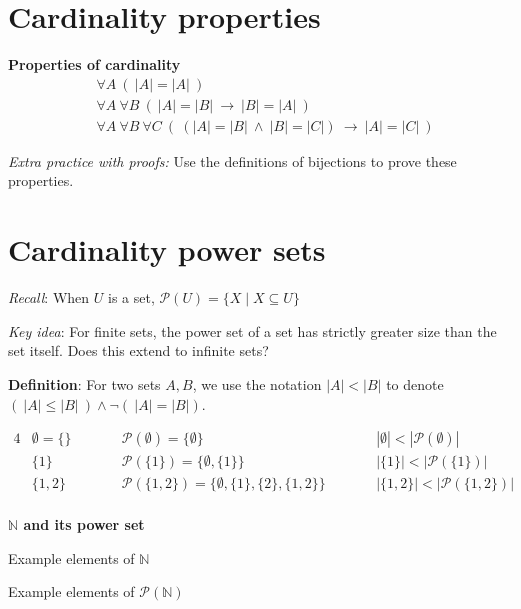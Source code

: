 \documentclass[12pt, oneside]{article}
\begin{document}
\begin{flushright}
\end{flushright} \section*{Cardinality properties}


{\bf Properties of cardinality}
\begin{align*}
&\forall A ~ (~  |A| = |A| ~)\\
&\forall A ~ \forall B ~(~ |A| = |B|  ~\to ~ |B| = |A|~)\\
&\forall A ~ \forall B ~ \forall C~ (~ (|A| = |B| ~\wedge~ |B| = |C|) ~\to ~ |A| = |C|~)
\end{align*}

{\it Extra practice with proofs:} Use the definitions of bijections to prove these properties. \vfill
\section*{Cardinality power sets}


{\it Recall}: When $U$ is a set, $\mathcal{P}(U) = \{ X \mid X \subseteq U\}$

{\it Key idea}: For finite sets, the power set of a set has strictly greater size than the set itself.
Does this extend to infinite sets?

{\bf Definition}: For two sets $A, B$, we use the notation $|A| < |B|$ to denote
$(~|A| \leq |B| ~) \land \lnot (~|A| = |B|)$.

\begin{alignat*}{4}
    &\emptyset = \{ \} \qquad &&\mathcal{P}(\emptyset) = \{ \emptyset \} \qquad &&|\emptyset| < |\mathcal{P}(\emptyset)| \\
    &\{1 \} \qquad &&\mathcal{P}(\{1\}) = \{ \emptyset, \{1\} \} \qquad &&|\{1\}| < |\mathcal{P}(\{1\})| \\
    &\{1,2 \} \qquad &&\mathcal{P}(\{1,2\}) = \{ \emptyset, \{1\}, \{2\}, \{1,2\} \} \qquad &&|\{1,2\}| < |\mathcal{P}(\{1,2\})| \\
\end{alignat*}

{\bf $\mathbb{N}$ and its power set}

Example elements of $\mathbb{N}$ 

\vspace{20pt}

Example elements of $\mathcal{P}(\mathbb{N})$
\end{document}

